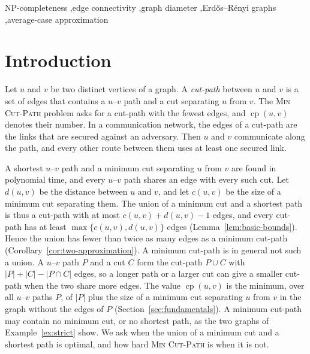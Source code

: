 \documentclass[a4paper,fleqn]{cas-sc}
\numberwithin{equation}{section}
\theoremstyle{definition}
\theoremstyle{plain}
\theoremstyle{remark}
\newcommand{\cp}{\operatorname{cp}}                  %
\newcommand{\MinCutPath}{\textsc{Min Cut-Path}}
\begin{document}
\begin{keywords}
NP-completeness \sep edge connectivity \sep graph diameter \sep Erdős–Rényi graphs \sep average-case approximation
\end{keywords}

\maketitle


\section{Introduction}
\label{sec:introduction}

Let $u$ and $v$ be two distinct vertices of a graph.
A \emph{cut-path} between $u$ and $v$ is a set of edges that contains a $u$--$v$ path and a cut separating $u$ from $v$.
The \MinCutPath{} problem asks for a cut-path with the fewest edges, and $\cp(u,v)$ denotes their number.
In a communication network, the edges of a cut-path are the links that are secured against an adversary.
Then $u$ and $v$ communicate along the path, and every other route between them uses at least one secured link.

A shortest $u$--$v$ path and a minimum cut separating $u$ from $v$ are found in polynomial time, and every $u$--$v$ path shares an edge with every such cut.
Let $d(u,v)$ be the distance between $u$ and $v$, and let $c(u,v)$ be the size of a minimum cut separating them.
The union of a minimum cut and a shortest path is thus a cut-path with at most $c(u,v) + d(u,v) - 1$ edges, and every cut-path has at least $\max\{c(u,v), d(u,v)\}$ edges (Lemma~\ref{lem:basic-bounds}).
Hence the union has fewer than twice as many edges as a minimum cut-path (Corollary~\ref{cor:two-approximation}).
A minimum cut-path is in general not such a union.
A $u$--$v$ path $P$ and a cut $C$ form the cut-path $P \cup C$ with $|P| + |C| - |P \cap C|$ edges, so a longer path or a larger cut can give a smaller cut-path when the two share more edges.
The value $\cp(u,v)$ is the minimum, over all $u$--$v$ paths $P$, of $|P|$ plus the size of a minimum cut separating $u$ from $v$ in the graph without the edges of $P$ (Section~\ref{sec:fundamentals}).
A minimum cut-path may contain no minimum cut, or no shortest path, as the two graphs of Example~\ref{ex:strict} show.
We ask when the union of a minimum cut and a shortest path is optimal, and how hard \MinCutPath{} is when it is not.
\end{document}
